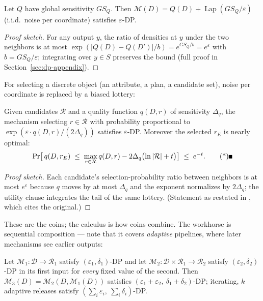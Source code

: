 \begin{theorem}\label{thm:dp-laplace}
Let $Q$ have global sensitivity $GS_Q$. Then
$\mathcal{M}(D) = Q(D) + \operatorname{Lap}(GS_Q/\varepsilon)$ (i.i.d.\ noise per
coordinate) satisfies $\varepsilon$-DP. \eop
\end{theorem}

\begin{proof}[Proof sketch]
For any output $y$, the ratio of densities at $y$ under the two neighbors is at most
$\exp(|Q(D)-Q(D')|/b) = e^{GS_Q/b} = e^{\varepsilon}$ with $b = GS_Q/\varepsilon$;
integrating over $y \in S$ preserves the bound (full proof in
Section~\ref{sec:dp-appendix}).
\end{proof}

For selecting a discrete object (an attribute, a plan, a candidate set), noise per
coordinate is replaced by a biased lottery:

\begin{theorem}\label{thm:dp-em}
Given candidates $\mathcal{R}$ and a quality function $q(D,r)$ of sensitivity
$\Delta_q$, the mechanism selecting $r \in \mathcal{R}$ with probability proportional to
$\exp(\varepsilon \cdot q(D,r) / (2\Delta_q))$ satisfies $\varepsilon$-DP. Moreover the
selected $r_E$ is nearly optimal:
\[
\Pr\bigl[\,q(D,r_E) \;\le\; \max_{r \in \mathcal{R}} q(D,r) - 2\Delta_q
\bigl(\ln|\mathcal{R}| + t\bigr)\bigr] \;\le\; e^{-t}. \eopm
\]
\end{theorem}

\begin{proof}[Proof sketch]
Each candidate's selection-probability ratio between neighbors is at most
$e^{\varepsilon}$ because $q$ moves by at most $\Delta_q$ and the exponent normalizes
by $2\Delta_q$; the utility clause integrates the tail of the same lottery. (Statement
as restated in \citep{sigmod26-298}, which cites the original.)
\end{proof}

These are the coins; the calculus is how coins combine. The workhorse is sequential
composition --- note that it covers \emph{adaptive} pipelines, where later mechanisms see
earlier outputs:

\begin{theorem}\label{thm:dp-seq}
Let $\mathcal{M}_1\colon \mathcal{D} \to \mathcal{R}_1$ satisfy
$(\varepsilon_1,\delta_1)$-DP and let $\mathcal{M}_2\colon \mathcal{D} \times
\mathcal{R}_1 \to \mathcal{R}_2$ satisfy $(\varepsilon_2,\delta_2)$-DP in its first
input for \emph{every} fixed value of the second. Then
$\mathcal{M}_3(D) = \mathcal{M}_2(D, \mathcal{M}_1(D))$ satisfies
$(\varepsilon_1+\varepsilon_2,\ \delta_1+\delta_2)$-DP; iterating, $k$ adaptive releases
satisfy $(\sum_i \varepsilon_i,\ \sum_i \delta_i)$-DP. \eop
\end{theorem}

